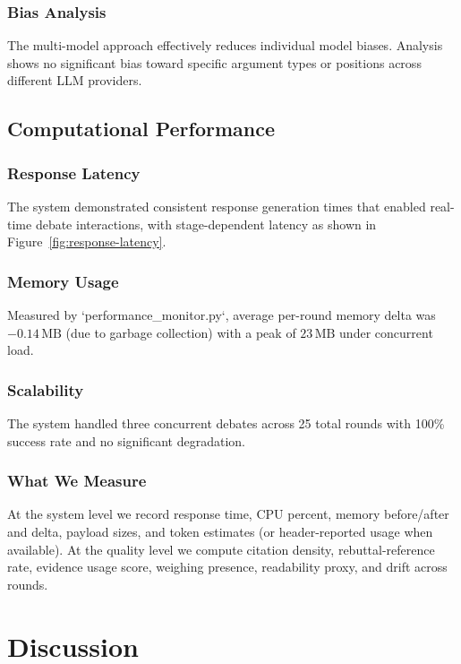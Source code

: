 \documentclass{article}
\begin{document}
\subsubsection{Bias Analysis}
The multi-model approach effectively reduces individual model biases. Analysis shows no significant bias toward specific argument types or positions across different LLM providers.

\subsection{Computational Performance}

\subsubsection{Response Latency}
The system demonstrated consistent response generation times that enabled real-time debate interactions, with stage-dependent latency as shown in Figure~\ref{fig:response-latency}.

\subsubsection{Memory Usage}
Measured by `performance\_monitor.py`, average per-round memory delta was \(-0.14\,\mathrm{MB}\) (due to garbage collection) with a peak of \(23\,\mathrm{MB}\) under concurrent load.

\subsubsection{Scalability}
The system handled three concurrent debates across 25 total rounds with 100\% success rate and no significant degradation.

\subsubsection{What We Measure}
At the system level we record response time, CPU percent, memory before/after and delta, payload sizes, and token estimates (or header-reported usage when available). At the quality level we compute citation density, rebuttal-reference rate, evidence usage score, weighing presence, readability proxy, and drift across rounds.

\section{Discussion}
\end{document}
